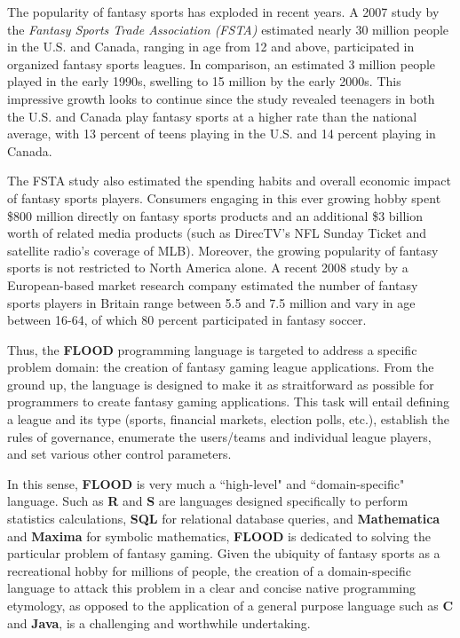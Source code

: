 \documentclass[12pt]{report}
\begin{document}
The popularity of fantasy sports has exploded in recent years. A 2007 study by the \textit{Fantasy Sports Trade Association (FSTA)} estimated  nearly 30 million people in the U.S. and Canada, ranging in age from 12 and above, participated in organized fantasy sports leagues. In comparison, an estimated 3 million people played in the early 1990s, swelling to 15 million by the early 2000s. This impressive growth looks to continue since the study revealed teenagers in both the U.S. and Canada play fantasy sports at a higher rate than the national average, with 13 percent of teens playing in the U.S. and 14 percent playing in Canada.

The FSTA study also estimated the spending habits and overall economic impact of fantasy sports players. Consumers engaging in this ever growing hobby spent \$800 million directly on fantasy sports products and an additional \$3 billion worth of related media products (such as DirecTV's NFL Sunday Ticket and satellite radio's coverage of MLB). Moreover, the growing popularity of fantasy sports is not restricted to North America alone. A recent 2008 study by a European-based market research company estimated the number of fantasy sports players in Britain range between 5.5 and 7.5 million and vary in age between 16-64, of which 80 percent participated in fantasy soccer.

Thus, the \textbf{FLOOD} programming language is targeted to address a specific problem domain: the creation of fantasy gaming league applications. From the ground up, the language is designed to make it as straitforward as possible for programmers to create fantasy gaming applications. This task will entail defining a league and its type (sports, financial markets, election polls, etc.), establish the rules of governance, enumerate the users/teams and individual league players, and set various other control parameters. 

In this sense, \textbf{FLOOD} is very much a ``high-level" and ``domain-specific" language. Such as \textbf{R} and \textbf{S} are languages designed specifically to perform statistics calculations, \textbf{SQL} for relational database queries, and \textbf{Mathematica} and \textbf{Maxima} for symbolic mathematics, \textbf{FLOOD} is dedicated to solving the particular problem of fantasy gaming. Given the ubiquity of fantasy sports as a recreational hobby for millions of people, the creation of a domain-specific language to attack this problem in a clear and concise native programming etymology, as opposed to the application of a general purpose language such as \textbf{C} and \textbf{Java}, is a challenging and worthwhile undertaking.
\end{document}
